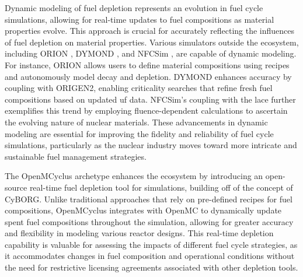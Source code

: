 Dynamic modeling of fuel depletion represents an evolution in fuel cycle simulations, allowing for real-time updates to fuel compositions as material properties evolve. This approach is crucial for accurately reflecting the
influences of fuel depletion on material properties. Various simulators outside
the \cyclus ecosystem, including ORION \cite{feng_standardized_2016}, DYMOND
\cite{richards_application_2021}, and NFCSim \cite{schneider_nfcsim_2005}, are capable of dynamic modeling. For instance, ORION allows users to
define material compositions using recipes and autonomously model decay and
depletion. DYMOND enhances accuracy by coupling with ORIGEN2, enabling
criticality searches that refine fresh fuel compositions based on updated
\gls{uf} data. NFCSim's coupling with the \gls{lace} further exemplifies this
trend by employing fluence-dependent calculations to ascertain the evolving
nature of nuclear materials. These advancements in dynamic modeling are
essential for improving the fidelity and reliability of fuel cycle simulations,
particularly as the nuclear industry moves toward more intricate and
sustainable fuel management strategies.

The OpenMCyclus archetype \cite{openmcyclus_paper} enhances the \cyclus
ecosystem by introducing an open-source real-time fuel depletion tool for
\cyclus simulations, building off of the concept of CyBORG. Unlike traditional
approaches that rely on pre-defined recipes for fuel compositions, OpenMCyclus
integrates with OpenMC \cite{romano_openmc_2015} to dynamically update spent
fuel compositions throughout the simulation, allowing for greater accuracy and
flexibility in modeling various reactor designs. This real-time depletion
capability is valuable for assessing the impacts of different fuel cycle
strategies, as it accommodates changes in fuel composition and operational
conditions without the need for restrictive licensing agreements associated
with other depletion tools.


